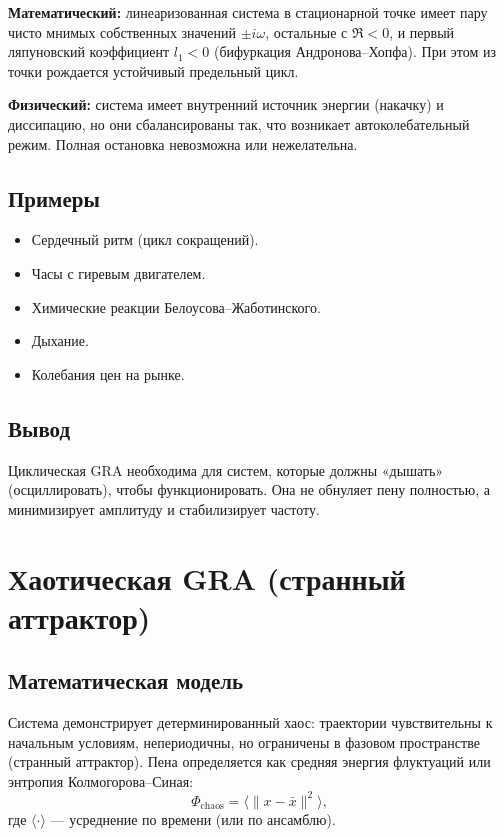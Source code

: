 \documentclass[12pt,a4paper]{article}
\begin{document}
\textbf{Математический:} линеаризованная система в стационарной точке имеет пару чисто мнимых собственных значений $\pm i\omega$, остальные с $\Re < 0$, и первый ляпуновский коэффициент $l_1 < 0$ (бифуркация Андронова–Хопфа). При этом из точки рождается устойчивый предельный цикл.

\textbf{Физический:} система имеет внутренний источник энергии (накачку) и диссипацию, но они сбалансированы так, что возникает автоколебательный режим. Полная остановка невозможна или нежелательна.

\subsection{Примеры}
\begin{itemize}
    \item Сердечный ритм (цикл сокращений).
    \item Часы с гиревым двигателем.
    \item Химические реакции Белоусова–Жаботинского.
    \item Дыхание.
    \item Колебания цен на рынке.
\end{itemize}

\subsection{Вывод}
Циклическая GRA необходима для систем, которые должны «дышать» (осциллировать), чтобы функционировать. Она не обнуляет пену полностью, а минимизирует амплитуду и стабилизирует частоту.

\section{Хаотическая GRA (странный аттрактор)}
\label{sec:chaotic}

\subsection{Математическая модель}

Система демонстрирует детерминированный хаос: траектории чувствительны к начальным условиям, непериодичны, но ограничены в фазовом пространстве (странный аттрактор). Пена определяется как средняя энергия флуктуаций или энтропия Колмогорова–Синая:
\begin{equation}
    \Phi_{\text{chaos}} = \langle \| x - \bar{x} \|^2 \rangle,
\end{equation}
где $\langle \cdot \rangle$ — усреднение по времени (или по ансамблю).
\end{document}
